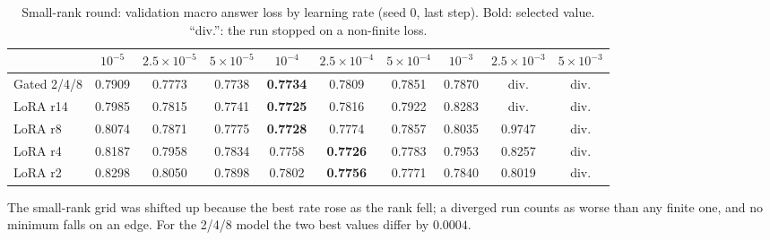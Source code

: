 \documentclass[11pt]{article}
\begin{document}
\begin{table}[h]
\centering
\small
\caption{Small-rank round: validation macro answer loss by learning rate (seed 0, last step).
Bold: selected value. ``div.'': the run stopped on a non-finite loss.}
\setlength{\tabcolsep}{3.5pt}
\begin{tabular}{lccccccccc}
\toprule
 & $10^{-5}$ & $2.5{\times}10^{-5}$ & $5{\times}10^{-5}$ & $10^{-4}$ & $2.5{\times}10^{-4}$ & $5{\times}10^{-4}$ & $10^{-3}$ & $2.5{\times}10^{-3}$ & $5{\times}10^{-3}$ \\
\midrule
Gated 2/4/8 & 0.7909 & 0.7773 & 0.7738 & \textbf{0.7734} & 0.7809 & 0.7851 & 0.7870 & div. & div. \\
LoRA r14    & 0.7985 & 0.7815 & 0.7741 & \textbf{0.7725} & 0.7816 & 0.7922 & 0.8283 & div. & div. \\
LoRA r8     & 0.8074 & 0.7871 & 0.7775 & \textbf{0.7728} & 0.7774 & 0.7857 & 0.8035 & 0.9747 & div. \\
LoRA r4     & 0.8187 & 0.7958 & 0.7834 & 0.7758 & \textbf{0.7726} & 0.7783 & 0.7953 & 0.8257 & div. \\
LoRA r2     & 0.8298 & 0.8050 & 0.7898 & 0.7802 & \textbf{0.7756} & 0.7771 & 0.7840 & 0.8019 & div. \\
\bottomrule
\end{tabular}
\end{table}
The small-rank grid was shifted up because the best rate rose as the rank fell; a diverged run
counts as worse than any finite one, and no minimum falls on an edge. For the 2/4/8 model the
two best values differ by $0.0004$.
\end{document}
